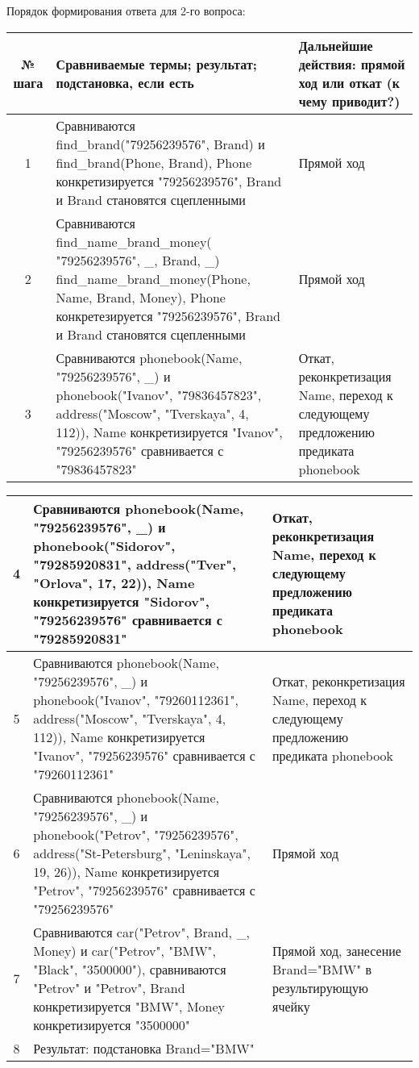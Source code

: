\documentclass[a4paper,12pt]{article}
\begin{document}
	Порядок формирования ответа для 2-го вопроса:
	\begin{table}[!ht]
		\begin{tabularx}{\linewidth}{|c|>{\centering}X|>{\centering}X|}
			\hline
			№ шага & Сравниваемые термы; результат; подстановка, если есть & Дальнейшие действия: прямой ход или откат (к чему приводит?)\tabularnewline
			\hline
			1 & Сравниваются find\_brand("79256239576"{}, Brand) и find\_brand(Phone, Brand), Phone конкретизируется "79256239576"{}, Brand и Brand становятся сцепленными  & Прямой ход \tabularnewline
			\hline
			2 & Сравниваются find\_name\_brand\_money( "79256239576"{}, \_, Brand, \_) find\_name\_brand\_money(Phone, Name, Brand, Money), Phone конкретезируется "79256239576"{}, Brand и Brand становятся сцепленными &  Прямой ход  \tabularnewline
			\hline
			3 & Сравниваются phonebook(Name, "79256239576"{}, \_) и phonebook("Ivanov"{}, "79836457823"{}, address("Moscow"{}, "Tverskaya"{}, 4, 112)), Name конкретизируется "Ivanov"{}, "79256239576" сравнивается с "79836457823" & Откат, реконкретизация Name, переход к следующему предложению предиката phonebook \tabularnewline
			\hline
		\end{tabularx}
	\end{table}
	\newpage
	\begin{table}[ht!] 
		\begin{tabularx}{\linewidth}{|c|>{\centering}X|>{\centering}X|}
			\hline
			4 & Сравниваются phonebook(Name, "79256239576"{}, \_) и phonebook("Sidorov"{}, "79285920831"{}, address("Tver"{}, "Orlova"{}, 17, 22)), Name конкретизируется "Sidorov"{}, "79256239576" сравнивается с "79285920831" & Откат, реконкретизация Name, переход к следующему предложению предиката phonebook \tabularnewline
			\hline
			5 & Сравниваются phonebook(Name, "79256239576"{}, \_) и phonebook("Ivanov"{}, "79260112361"{}, address("Moscow"{}, "Tverskaya"{}, 4, 112)), Name конкретизируется "Ivanov"{}, "79256239576" сравнивается с "79260112361" & Откат, реконкретизация Name, переход к следующему предложению предиката phonebook \tabularnewline
			\hline
			6 & Сравниваются phonebook(Name, "79256239576"{}, \_) и phonebook("Petrov"{}, "79256239576"{}, address("St-Petersburg"{}, "Leninskaya{}", 19, 26)), Name конкретизируется "Petrov"{}, "79256239576" сравнивается с "79256239576" & Прямой ход \tabularnewline
			\hline
			7 & Сравниваются car("Petrov"{}, Brand, \_, Money) и car("Petrov"{}, "BMW"{}, "Black"{}, "3500000"), сравниваются "Petrov" и "Petrov"{}, Brand конкретизируется  "BMW"{}, Money конкретизируется "3500000" & Прямой ход, занесение Brand="BMW" в результирующую ячейку \tabularnewline
			\hline
			8 & Результат: подстановка Brand="BMW" &  \tabularnewline
			\hline
		\end{tabularx}
	\end{table}		
	
\end{document}
